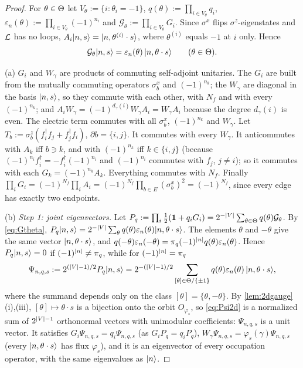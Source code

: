 \begin{proof}
For $\theta\in\Theta$ let $V_\theta:=\{i:\theta_i=-1\}$, $q(\theta):=\prod_{i\in V_\theta}q_i$,
$\varepsilon_n(\theta):=\prod_{i\in V_\theta}(-1)^{n_i}$ and $\mathcal G_\theta:=\prod_{i\in V_\theta}G_i$.
Since $\sigma^x$ flips $\sigma^z$-eigenstates and $\mathcal{L}$ has no loops, $A_i|n,s\rangle=|n,\theta^{(i)}\cdot s\rangle$,
where $\theta^{(i)}$ equals $-1$ at $i$ only.  Hence
\begin{equation}\label{eq:Gtheta}
  \mathcal G_\theta|n,s\rangle=\varepsilon_n(\theta)\,|n,\theta\cdot s\rangle\qquad(\theta\in\Theta).
\end{equation}

(a) $G_i$ and $W_\gamma$ are products of commuting self-adjoint unitaries.  The $G_i$ are built from the
mutually commuting operators $\sigma^x_b$ and $(-1)^{n_k}$; the $W_\gamma$ are diagonal in the basis
$|n,s\rangle$, so they commute with each other, with $N_f$ and with every $(-1)^{n_k}$; and
$A_iW_\gamma=(-1)^{d_\gamma(i)}W_\gamma A_i=W_\gamma A_i$ because the degree $d_\gamma(i)$ is even.  The
electric term commutes with all $\sigma^x_b$, $(-1)^{n_k}$ and $W_\gamma$.  Let
$T_b:=\sigma^z_b(f_i^\dagger f_j+f_j^\dagger f_i)$, $\partial b=\{i,j\}$.  It commutes with every
$W_\gamma$.  It anticommutes with $A_k$ iff $b\ni k$, and with $(-1)^{n_k}$ iff $k\in\{i,j\}$ (because
$(-1)^{n_i}f_i^\dagger=-f_i^\dagger(-1)^{n_i}$ and $(-1)^{n_i}$ commutes with $f_j$, $j\ne i$); so it
commutes with each $G_k=(-1)^{n_k}A_k$.  Everything commutes with $N_f$.  Finally
$\prod_iG_i=(-1)^{N_f}\prod_iA_i=(-1)^{N_f}\prod_{b\in E}(\sigma^x_b)^2=(-1)^{N_f}$, since every edge has
exactly two endpoints.

(b) \emph{Step 1: joint eigenvectors.}  Let $P_q:=\prod_i\frac12(\mathbf{1}+q_iG_i)=2^{-\left|V\right|}\sum_{\theta\in\Theta}q(\theta)\mathcal G_\theta$.
By \eqref{eq:Gtheta}, $P_q|n,s\rangle=2^{-\left|V\right|}\sum_\theta q(\theta)\varepsilon_n(\theta)|n,\theta\cdot s\rangle$.  The
elements $\theta$ and $-\theta$ give the same vector $|n,\theta\cdot s\rangle$, and
$q(-\theta)\varepsilon_n(-\theta)=\pi_q(-1)^{\left|n\right|}q(\theta)\varepsilon_n(\theta)$.  Hence $P_q|n,s\rangle=0$ if
$(-1)^{\left|n\right|}\neq\pi_q$, while for $(-1)^{\left|n\right|}=\pi_q$
\begin{equation}\label{eq:Psi2d}
  \Psi_{n,q,s}:=2^{(\left|V\right|-1)/2}P_q|n,s\rangle
  =2^{-(\left|V\right|-1)/2}\sum_{[\theta]\in\Theta/\{\pm1\}}q(\theta)\varepsilon_n(\theta)\,|n,\theta\cdot s\rangle,
\end{equation}
where the summand depends only on the class $[\theta]=\{\theta,-\theta\}$.  By \cref{lem:2dgauge}(i),(iii),
$[\theta]\mapsto\theta\cdot s$ is a bijection onto the orbit $O_{\varphi_s}$, so \eqref{eq:Psi2d} is a normalized
sum of $2^{\left|V\right|-1}$ orthonormal vectors with unimodular coefficients: $\Psi_{n,q,s}$ is a unit vector.  It
satisfies $G_i\Psi_{n,q,s}=q_i\Psi_{n,q,s}$ (as $G_iP_q=q_iP_q$), $W_\gamma\Psi_{n,q,s}=\varphi_s(\gamma)\Psi_{n,q,s}$
(every $|n,\theta\cdot s\rangle$ has flux $\varphi_s$), and it is an eigenvector of every occupation operator, with
the same eigenvalues as $|n\rangle$.


\end{proof}
